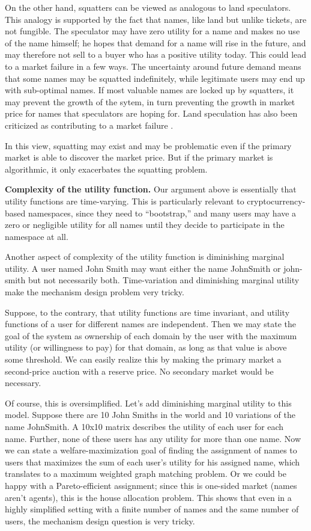 On the other hand, squatters can be viewed as analogous to land speculators. This analogy is supported by the fact that names, like land but unlike tickets, are not fungible. The speculator may have zero utility for a name and makes no use of the name himself; he hopes that demand for a name will rise in the future, and may therefore not sell to a buyer who has a positive utility today. This could lead to a market failure in a few ways. The uncertainty around future demand means that some names may be squatted indefinitely, while legitimate users may end up with sub-optimal names. If most valuable names are locked up by squatters, it may prevent the growth of the sytem, in turn preventing the growth in market price for names that speculators are hoping for. Land speculation has also been criticized as contributing to a market failure \cite{archer73}. 


In this view, squatting may exist and may be problematic even if the primary market is able to discover the market price. But if the primary market is algorithmic, it only exacerbates the squatting problem.


{\bf Complexity of the utility function.} 
Our argument above is essentially that utility functions are time-varying. This is particularly relevant to cryptocurrency-based namespaces, since they need to ``bootstrap,'' \hi{[explain]} and many users may have a zero or negligible utility for all names until they decide to participate in the namespace at all.

Another aspect of complexity of the utility function is diminishing marginal utility. A user named John Smith may want either the name \textsf{JohnSmith} or \textsf{john-smith} but not necessarily both. Time-variation and diminishing marginal utility make the mechanism design problem very tricky.

Suppose, to the contrary, that utility functions are time invariant, and utility functions of a user for different names are independent. Then we may state the goal of the system as ownership of each domain by the user with the maximum utility (or willingness to pay) for that domain, as long as that value is above some threshold. We can easily realize this by making the primary market a second-price auction with a reserve price. No secondary market would be necessary.

Of course, this is oversimplified. Let's add diminishing marginal utility to this model. Suppose there are 10 John Smiths in the world and 10 variations of the name \textsf{JohnSmith}. A 10x10 matrix describes the utility of each user for each name. Further, none of these users has any utility for more than one name. Now we can state a welfare-maximization goal of finding the assignment of names to users that maximizes the sum of each user's utility for his assigned name, which translates to a maximum weighted graph matching problem. Or we could be happy with a Pareto-efficient assignment; since this is one-sided market (names aren't agents), this is the house allocation problem. This shows that even in a highly simplified setting with a finite number of names and the same number of users, the mechanism design question is very tricky.

